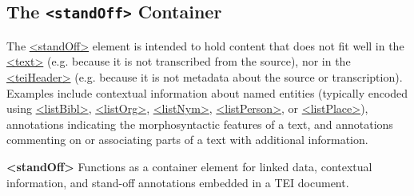 \subsection[{The standOff Container}]{The \texttt{<standOff>} Container}\label{SASOstdf}\par
The \hyperref[TEI.standOff]{<standOff>} element is intended to hold content that does not fit well in the \hyperref[TEI.text]{<text>} (e.g. because it is not transcribed from the source), nor in the \hyperref[TEI.teiHeader]{<teiHeader>} (e.g. because it is not metadata about the source or transcription). Examples include contextual information about named entities (typically encoded using \hyperref[TEI.listBibl]{<listBibl>}, \hyperref[TEI.listOrg]{<listOrg>}, \hyperref[TEI.listNym]{<listNym>}, \hyperref[TEI.listPerson]{<listPerson>}, or \hyperref[TEI.listPlace]{<listPlace>}), annotations indicating the morphosyntactic features of a text, and annotations commenting on or associating parts of a text with additional information. 
\begin{sansreflist}
  
\item [\textbf{<standOff>}] Functions as a container element for linked data, contextual information, and stand-off annotations embedded in a TEI document.
\end{sansreflist}
\par
